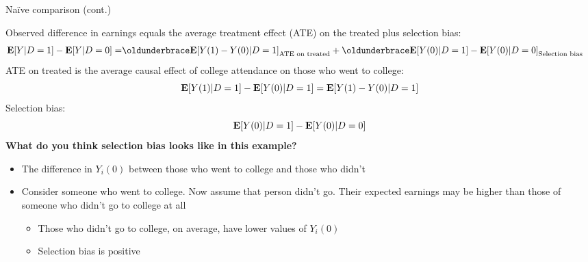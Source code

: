\documentclass[compress, 8pt]{beamer}
\begin{document}
\begin{frame}{Na{\"i}ve comparison (cont.)}

Observed difference in earnings equals the average treatment effect (ATE) on the treated plus selection bias:
\begin{align*}
\EE [Y \vert D = 1] - \EE [Y \vert D=0] 
=& \underbrace{\EE [Y(1) - Y(0) \vert D = 1]}_{\text{ATE on treated}} 
+ \underbrace{\EE [Y(0) \vert D = 1] - \EE [Y(0) \vert D=0]}_{\text{Selection bias}}
\end{align*}
ATE on treated is the average causal effect of college attendance on those who went to college:
\begin{equation*}
    \mathbf{E} [Y(1) \vert D=1] - \mathbf{E} [Y(0) \vert D = 1] = \mathbf{E} [Y(1) - Y(0) \vert D = 1]
\end{equation*}
Selection bias:
\begin{equation*}
    \mathbf{E} [Y(0) \vert D = 1] - \mathbf{E} [Y(0) \vert D=0]
\end{equation*}
\textbf{What do you think selection bias looks like in this example?}

\pause
\begin{itemize}
    \item The difference in $Y_i(0)$ between those who went to college and those who didn't 
    \item Consider someone who went to college. Now assume that person didn't go. Their expected earnings may be higher than those of someone who didn't go to college at all 
    \begin{itemize}
        \item[$\implies$] Those who didn't go to college, on average, have lower values of $Y_i(0)$

        \item[$\implies$] Selection bias is positive
    \end{itemize}
\end{itemize}
\end{frame}
\end{document}
